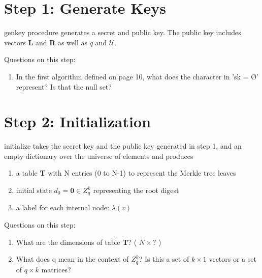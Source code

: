 \documentclass[11pt, letterpaper, oneside]{article}
\begin{document}
\section{Step 1: Generate Keys}

	genkey procedure generates a secret and public key.  The public key includes vectors \textbf{L} and \textbf{R} as well as $q$ and $\mathcal{U}$.
	
	Questions on this step:
	\begin{enumerate}
	\item	 In the first algorithm defined on page 10, what does the character in 'sk =  \O' represent? Is that the null set?
	\end{enumerate}

\section{Step 2: Initialization}

	initialize takes the secret key and the public key generated in step 1, and an empty dictionary over the universe of elements and produces
	
	\begin{enumerate}
	\item a table \textbf{T} with N entries (0 to N-1) to represent the Merkle tree leaves
	\item initial state $d_{0} = \textbf{0} \in Z_{q}^{k}$ representing the root digest
	\item a label for each internal node: $\lambda(v)$
	\end{enumerate}
	
	
	Questions on this step:
	\begin{enumerate}
	\item What are the dimensions of table \textbf{T}?  ( $N \times ?$ )
	\item What does q mean in the context of $Z_{q}^{k}$?  Is this a set of $k \times 1$ vectors or a set of $q \times k$ matrices?
	\end{enumerate}
	
\end{document}
